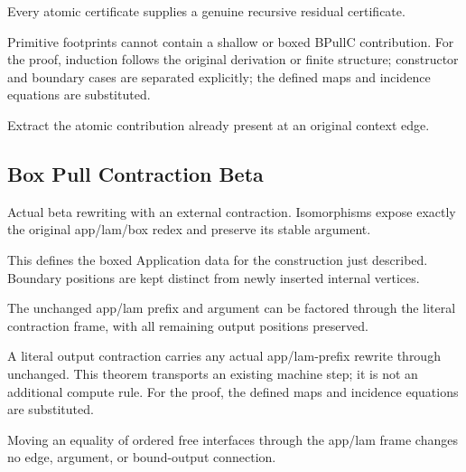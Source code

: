 Every atomic certificate supplies a genuine recursive residual certificate.
\par{}

Primitive footprints cannot contain a shallow or boxed BPullC contribution.
For the proof, induction follows the original derivation or finite structure; constructor and boundary cases are separated explicitly; the defined maps and incidence equations are substituted.
\par{}

Extract the atomic contribution already present at an original context edge.
\par{}

\subsection{Box Pull Contraction Beta}
Actual beta rewriting with an external contraction. Isomorphisms expose exactly the original app/lam/box redex and preserve its stable argument.

This defines the boxed Application data for the construction just described. Boundary positions are kept distinct from newly inserted internal vertices.
\par{}

The unchanged app/lam prefix and argument can be factored through the literal contraction frame, with all remaining output positions preserved.
\par{}

A literal output contraction carries any actual app/lam-prefix rewrite through unchanged. This theorem transports an existing machine step; it is not an additional compute rule.
For the proof, the defined maps and incidence equations are substituted.
\par{}

Moving an equality of ordered free interfaces through the app/lam frame changes no edge, argument, or bound-output connection.
\par{}

